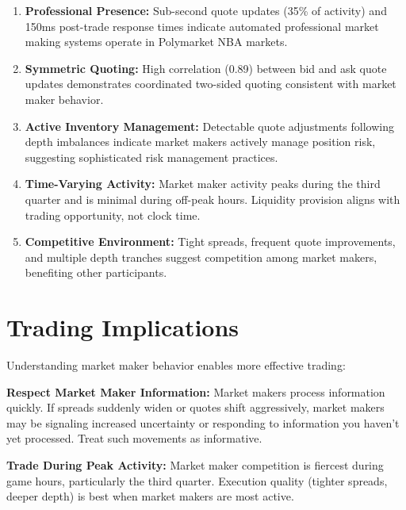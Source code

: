 \begin{keyfindings}
\begin{enumerate}
    \item \textbf{Professional Presence:} Sub-second quote updates (35\% of activity) and 150ms post-trade response times indicate automated professional market making systems operate in Polymarket NBA markets.

    \item \textbf{Symmetric Quoting:} High correlation (0.89) between bid and ask quote updates demonstrates coordinated two-sided quoting consistent with market maker behavior.

    \item \textbf{Active Inventory Management:} Detectable quote adjustments following depth imbalances indicate market makers actively manage position risk, suggesting sophisticated risk management practices.

    \item \textbf{Time-Varying Activity:} Market maker activity peaks during the third quarter and is minimal during off-peak hours. Liquidity provision aligns with trading opportunity, not clock time.

    \item \textbf{Competitive Environment:} Tight spreads, frequent quote improvements, and multiple depth tranches suggest competition among market makers, benefiting other participants.
\end{enumerate}
\end{keyfindings}

\section{Trading Implications}

Understanding market maker behavior enables more effective trading:

\textbf{Respect Market Maker Information:} Market makers process information quickly. If spreads suddenly widen or quotes shift aggressively, market makers may be signaling increased uncertainty or responding to information you haven't yet processed. Treat such movements as informative.

\textbf{Trade During Peak Activity:} Market maker competition is fiercest during game hours, particularly the third quarter. Execution quality (tighter spreads, deeper depth) is best when market makers are most active.

